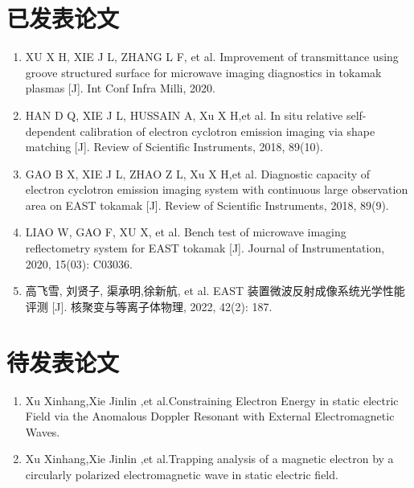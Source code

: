 
\begin{publications}

\section*{已发表论文}

\begin{enumerate}
\item XU X H, XIE J L, ZHANG L F, et al. Improvement of transmittance using groove structured surface for microwave imaging diagnostics in tokamak plasmas [J]. Int Conf Infra Milli, 2020.
\item HAN D Q, XIE J L, HUSSAIN A, Xu X H,et al. In situ relative self-dependent calibration of electron cyclotron emission imaging via shape matching [J]. Review of Scientific Instruments, 2018, 89(10).
\item GAO B X, XIE J L, ZHAO Z L, Xu X H,et al. Diagnostic capacity of electron cyclotron emission imaging system with continuous large observation area on EAST tokamak [J]. Review of Scientific Instruments, 2018, 89(9).
\item
LIAO W, GAO F, XU X, et al. Bench test of microwave imaging reflectometry system for EAST tokamak [J]. Journal of Instrumentation, 2020, 15(03): C03036.
\item
高飞雪, 刘贤子, 渠承明,徐新航, et al. EAST 装置微波反射成像系统光学性能评测 [J]. 核聚变与等离子体物理, 2022, 42(2): 187.
\end{enumerate}

\section*{待发表论文}

\begin{enumerate}
\item Xu Xinhang,Xie Jinlin ,et al.Constraining Electron Energy in static electric Field via the Anomalous Doppler Resonant with External Electromagnetic Waves.
\item Xu Xinhang,Xie Jinlin ,et al.Trapping analysis of a magnetic electron by a circularly polarized electromagnetic wave in static electric field.
\end{enumerate}


\end{publications}
